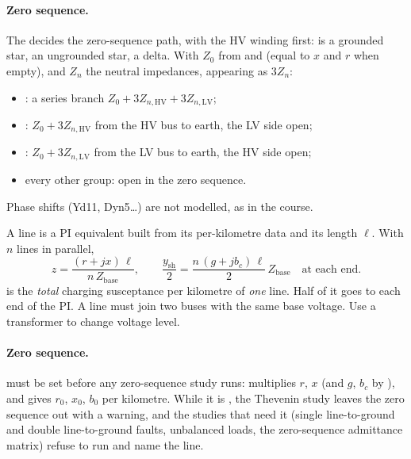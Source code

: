\paragraph{Zero sequence.} The  decides the zero-sequence path, with the
HV winding first:  is a grounded star,  an ungrounded star,  a
delta. With $Z_0$ from  and  (equal to $x$ and $r$ when empty), and $Z_n$
the neutral impedances, appearing as $3Z_n$:

\begin{itemize}
  \item {}: a series branch $Z_0 + 3Z_{n,\text{HV}} + 3Z_{n,\text{LV}}$;
  \item {}: $Z_0 + 3Z_{n,\text{HV}}$ from the HV bus to earth, the LV side open;
  \item {}: $Z_0 + 3Z_{n,\text{LV}}$ from the LV bus to earth, the HV side open;
  \item every other group: open in the zero sequence.
\end{itemize}

Phase shifts (Yd11, Dyn5\dots) are not modelled, as in the course.




A line is a PI equivalent built from its per-kilometre data and its length $\ell$. With
$n$ lines in parallel,
\[
  z = \frac{(r + jx)\,\ell}{n\,Z_\text{base}}, \qquad
  \frac{y_\text{sh}}{2} = \frac{n\,(g + jb_c)\,\ell}{2}\,Z_\text{base}
  \quad\text{at each end.}
\]
 is the \emph{total} charging susceptance per kilometre of \emph{one} line. Half
of it goes to each end of the PI. A line must join two buses with the same base voltage.
Use a transformer to change voltage level.

\paragraph{Zero sequence.}  must be set before any zero-sequence study runs:
 multiplies $r$, $x$ (and $g$, $b_c$ by ), and 
gives $r_0$, $x_0$, $b_0$ per kilometre. While it is , the Thevenin study
leaves the zero sequence out with a warning, and the studies that need it (single
line-to-ground and double line-to-ground faults, unbalanced loads, the zero-sequence
admittance matrix) refuse to run and name the line.

